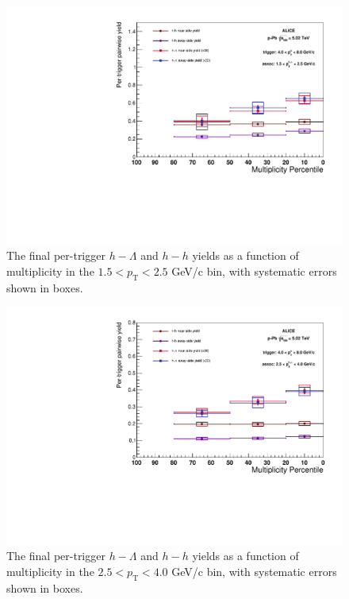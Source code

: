 \documentclass[ALICE,manyauthors]{ALICE_analysis_notes}
\begin{document}
\begin{figure}[ht]
\centering
\includegraphics[width=5in]{figures/pairwise_plot_lowpt.pdf}
\caption{The final per-trigger $h-\Lambda$ and $h-h$ yields as a function of multiplicity in the $1.5 < p_{\text{T}} < 2.5$ GeV/c bin, with systematic errors shown in boxes.}
\label{low_momentum_yield}
\end{figure}

\begin{figure}[ht]
\centering
\includegraphics[width=5in]{figures/pairwise_plot_highpt.pdf}
\caption{The final per-trigger $h-\Lambda$ and $h-h$ yields as a function of multiplicity in the $2.5 < p_{\text{T}} < 4.0$ GeV/c bin, with systematic errors shown in boxes.}
\label{high_momentum_yield}
\end{figure}
\end{document}
